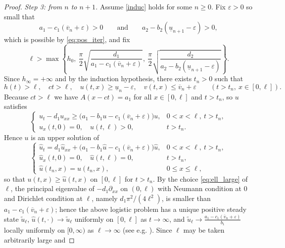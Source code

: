 \documentclass[reqno]{amsart}
\theoremstyle{plain}
\theoremstyle{definition}
\theoremstyle{remark}
\begin{document}
\begin{proof}
	\textit{Step 3: from $n$ to $n+1$.} Assume \eqref{induc} holds for some
	$n\ge0$. Fix $\varepsilon>0$ so small that
	\begin{equation}\label{eq:eps_small}
		a_1-c_1(\overline v_n+\varepsilon)>0
		\qquad\text{and}\qquad
		a_2-b_2(\underline u_{n+1}-\varepsilon)>0,
	\end{equation}
	which is possible by \eqref{eq:pos_iter}, and fix
	\begin{equation}\label{eq:ell_large}
		\ell>\max\left\{h_0,\ \frac{\pi}{2}\sqrt{\frac{d_1}{a_1-c_1(\overline v_n+\varepsilon)}},\
		\frac{\pi}{2}\sqrt{\frac{d_2}{a_2-b_2(\underline u_{n+1}-\varepsilon)}}\right\}.
	\end{equation}
	Since $h_\infty=+\infty$ and by the induction hypothesis, there exists
	$t_n>0$ such that
	\begin{equation}\label{eq:tn}
		h(t)>\ell,\quad ct>\ell,\quad
		u(t,x)\ge\underline{u}_n-\varepsilon,\quad
		v(t,x)\le \overline{v}_n+\varepsilon
		\qquad (t>t_n,\ x\in[0,\ell]).
	\end{equation}
	Because $ct>\ell$ we have $A(x-ct)=a_1$ for all $x\in[0,\ell]$ and $t>t_n$, so
	$u$ satisfies
	\[
	\begin{cases}
		u_t - d_1u_{xx} \ge \big(a_1 - b_1 u - c_1 (\overline{v}_n+\varepsilon)\big) u , & 0 < x< \ell, ~ t > t_n,\\
		u_x(t, 0) = 0, \quad u(t, \ell) > 0, & t > t_n .
	\end{cases}
	\]
	Hence $u$ is an upper solution of
	\[
	\begin{cases}
		\hat{u}_t = d_1 \hat{u}_{xx} + \big(a_1 - b_1 \hat{u} - c_1 (\overline{v}_n + \varepsilon)\big)\hat{u}, & 0 < x < \ell, ~ t > t_n,\\
		\hat{u}_x(t,0) = 0, \quad \hat{u}(t,\ell) = 0, & t > t_n,\\
		\hat{u}(t_n,x) = u(t_n,x), & 0 \le x \le \ell,
	\end{cases}
	\]
	so that $u(t,x)\ge\hat u(t,x)$ on $[0,\ell]$ for $t>t_n$. By the choice
	\eqref{eq:ell_large} of $\ell$, the principal eigenvalue of
	$-d_1\partial_{xx}$ on $(0,\ell)$ with Neumann condition at $0$ and Dirichlet
	condition at $\ell$, namely $d_1\pi^2/(4\ell^2)$, is smaller than
	$a_1-c_1(\overline v_n+\varepsilon)$; hence the above logistic problem has a
	unique positive steady state $\tilde u_\ell$, $\hat u(t,\cdot)\to\tilde u_\ell$
	uniformly on $[0,\ell]$ as $t\to\infty$, and
	$\tilde{u}_\ell\to\frac{a_1-c_1(\overline v_n+\varepsilon)}{b_1}$ locally
	uniformly on $[0,\infty)$ as $\ell\to\infty$ (see e.g.
	\cite[Lemma 2.2]{DU_MA_2001}). Since $\ell$ may be taken arbitrarily large and

\end{proof}
\end{document}

